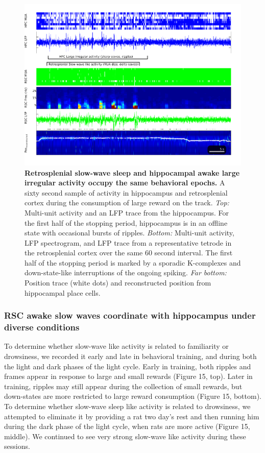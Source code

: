 \documentclass[]{article}
\begin{document}
\begin{figure}[htbp]
\centering
\includegraphics{./finalFigs/SWW/exampleExtended.png}
\caption{\textbf{Retrosplenial slow-wave sleep and hippocampal awake
large irregular activity occupy the same behavioral epochs.} A sixty
second sample of activity in hippocampus and retrosplenial cortex during
the consumption of large reward on the track. \emph{Top:} Multi-unit
activity and an LFP trace from the hippocampus. For the first half of
the stopping period, hippocampus is in an offline state with occasional
bursts of ripples. \emph{Bottom:} Multi-unit activity, LFP spectrogram,
and LFP trace from a representative tetrode in the retrosplenial cortex
over the same 60 second interval. The first half of the stopping period
is marked by a sporadic K-complexes and down-state-like interruptions of
the ongoing spiking. \emph{Far bottom:} Position trace (white dots) and
reconstructed position from hippocampal place cells.}
\end{figure}

\subsubsection{RSC awake slow waves coordinate with hippocampus under
diverse conditions}

To determine whether slow-wave like activity is related to familiarity
or drowsiness, we recorded it early and late in behavioral training, and
during both the light and dark phases of the light cycle. Early in
training, both ripples and frames appear in response to large and small
rewards (Figure 15, top). Later in training, ripples may still appear
during the collection of small rewards, but down-states are more
restricted to large reward consumption (Figure 15, bottom). To determine
whether slow-wave sleep like activity is related to drowsiness, we
attempted to eliminate it by providing a rat two day's rest and then
running him during the dark phase of the light cycle, when rats are more
active (Figure 15, middle). We continued to see very strong slow-wave
like activity during these sessions.
\end{document}
